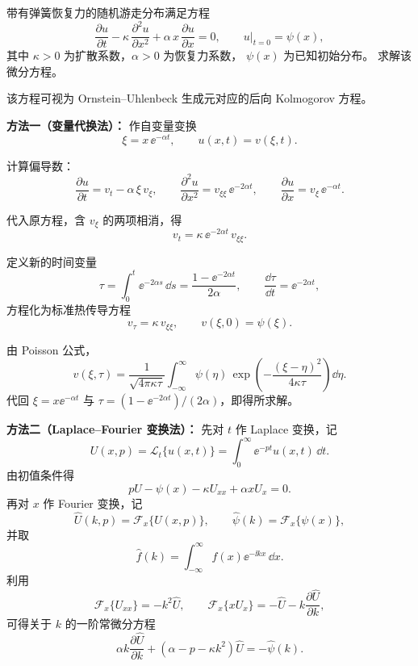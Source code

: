 \begin{question}[弹簧恢复力随机游走]

带有弹簧恢复力的随机游走分布满足方程
\[
\frac{\partial u}{\partial t}
- \kappa\,\frac{\partial^{2} u}{\partial x^{2}}
+ \alpha\,x\,\frac{\partial u}{\partial x} = 0,
\qquad u\big|_{t=0} = \psi(x),
\]
其中 $\kappa > 0$ 为扩散系数，$\alpha > 0$ 为恢复力系数，
$\psi(x)$ 为已知初始分布。
求解该微分方程。

\begin{solution}
该方程可视为 Ornstein--Uhlenbeck 生成元对应的后向 Kolmogorov 方程。

\textbf{方法一（变量代换法）：}
作自变量变换
\[
\xi = x\,\ee^{-\alpha t},\qquad u(x,t) = v(\xi, t).
\]

计算偏导数：
\[
\frac{\partial u}{\partial t} = v_{t} - \alpha\,\xi\,v_{\xi},\qquad
\frac{\partial^{2} u}{\partial x^{2}} = v_{\xi\xi}\,\ee^{-2\alpha t},
\qquad
\frac{\partial u}{\partial x} = v_{\xi}\,\ee^{-\alpha t}.
\]

代入原方程，含 $v_{\xi}$ 的两项相消，得
\[
v_{t} = \kappa\,\ee^{-2\alpha t}\,v_{\xi\xi}.
\]

定义新的时间变量
\[
\tau = \int_{0}^{t} \ee^{-2\alpha s}\,\dd s
= \frac{1 - \ee^{-2\alpha t}}{2\alpha},
\qquad \frac{\dd\tau}{\dd t} = \ee^{-2\alpha t},
\]
方程化为标准热传导方程
\[
v_{\tau} = \kappa\,v_{\xi\xi},
\qquad v(\xi,0) = \psi(\xi).
\]

由 Poisson 公式，
\[
v(\xi,\tau) = \frac{1}{\sqrt{4\pi\kappa\tau}}
\int_{-\infty}^{\infty} \psi(\eta)\,
\exp\!\left(-\frac{(\xi-\eta)^{2}}{4\kappa\tau}\right)\dd\eta.
\]
代回 $\xi=x\ee^{-\alpha t}$ 与
$\tau=(1-\ee^{-2\alpha t})/(2\alpha)$，即得所求解。

\textbf{方法二（Laplace--Fourier 变换法）：}
先对 $t$ 作 Laplace 变换，记
\[
U(x,p)=\mathcal{L}_{t}\{u(x,t)\}
=\int_{0}^{\infty}\ee^{-pt}u(x,t)\,\dd t.
\]
由初值条件得
\[
pU-\psi(x)-\kappa U_{xx}+\alpha xU_{x}=0.
\]
再对 $x$ 作 Fourier 变换，记
\[
\hat U(k,p)=\mathcal{F}_{x}\{U(x,p)\},\qquad
\hat\psi(k)=\mathcal{F}_{x}\{\psi(x)\},
\]
并取
\[
\hat f(k)=\int_{-\infty}^{\infty}f(x)\ee^{-\ii kx}\,\dd x.
\]
利用
\[
\mathcal{F}_{x}\{U_{xx}\}=-k^{2}\hat U,
\qquad
\mathcal{F}_{x}\{xU_{x}\}=-\hat U-k\frac{\partial\hat U}{\partial k},
\]
可得关于 $k$ 的一阶常微分方程
\[
\alpha k\frac{\partial\hat U}{\partial k}
+(\alpha-p-\kappa k^{2})\hat U=-\hat\psi(k).
\]


\end{solution}
\end{question}
